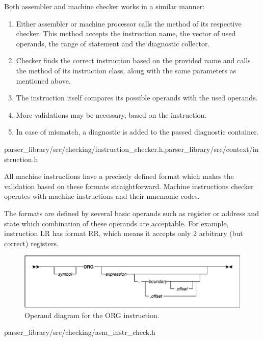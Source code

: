 Both assembler and machine checker works in a similar manner:
\begin{enumerate}
	\item Either assembler or machine processor calls the  method of its respective checker. This method accepts the instruction name, the vector of used operands, the range of statement and the diagnostic collector.
	\item Checker finds the correct instruction based on the provided name and calls the  method of its instruction class, along with the same parameters as mentioned above.
	\item The instruction itself compares its possible operands with the used operands.
	\item More validations may be necessary, based on the instruction.
	\item In case of mismatch, a diagnostic is added to the passed diagnostic container.
\end{enumerate}

{parser\_library/src/checking/instruction\_checker.h,parser\_library/src/context/instruction.h}

All machine instructions have a precisely defined format which makes the validation based on these formats straightforward. Machine instructions checker operates with machine instructions and their mnemonic codes.

The formats are defined by several basic operands such as register or address and state which combination of these operands are acceptable. For example, instruction LR has format RR, which means it accepts only 2 arbitrary (but correct) registers. 

\begin{figure}
	\centering
	\includegraphics[width=\textwidth]{img/org_diagram}
	\caption{Operand diagram for the ORG instruction.}
	
	\label{fig01:check}
\end{figure}

{parser\_library/src/checking/asm\_instr\_check.h}
\label{sub:asm_check}

